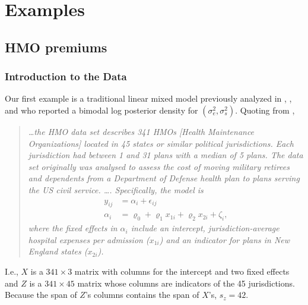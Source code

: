 \documentclass{report}
\newcommand{\sigssq}{\sigma_s^2}
\newcommand{\sigesq}{\sigma_e^2}
\begin{document}
\section{Examples}

\subsection{HMO premiums}
\subsubsection{Introduction to the Data}
Our first example is a traditional linear mixed model previously analyzed in \cite{hodges:98}, \cite{hodges:2013}, and \cite{henn&hodges:2014} who reported a bimodal log posterior density for $(\sigesq,\sigssq)$.  Quoting from \cite{henn&hodges:2014},
\begin{quote}
\itshape
\dots the HMO data set describes 341 HMOs [Health Maintenance Organizations] located in 45 states or similar political jurisdictions.  Each jurisdiction had between 1 and 31 plans with a median of 5 plans.  The data set originally was analysed to assess the cost of moving military retirees and dependents from a Department of Defense health plan to plans serving the US civil service.  \dots.  Specifically, the model is
\begin{equation*}
\begin{split}
	y_{ij} &= \alpha_i + \epsilon_{ij}\\
	\alpha_i &= \varrho_0 + \varrho_1x_{1i} + \varrho_2x_{2i} + \zeta_i,
\end{split}
\end{equation*}
where the fixed effects in $\alpha_i$ include an intercept, jurisdiction-average hospital expenses per admission ($x_{1i}$) and an indicator for plans in New England states ($x_{2i}$).

\upshape
\end{quote}
I.e., $X$ is a $341 \times 3$ matrix with columns for the intercept and two fixed effects and $Z$ is a $341 \times 45$ matrix whose columns are indicators of the 45 jurisdictions.  Because the span of $Z$'s columns contains the span of $X$'s, $s_z = 42$.  
\end{document}
